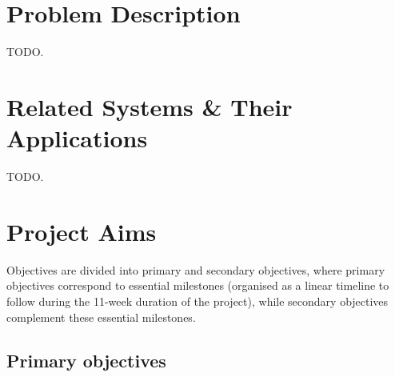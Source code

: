 \section{Problem Description}
\label{sec:problem-description}

TODO.\\


\section{Related Systems \& Their Applications}
\label{sec:v2v_applications}

TODO.\\


\section{Project Aims}
\label{sec:introduction-project-aims}

Objectives are divided into primary and secondary objectives, where primary objectives correspond to essential milestones (organised as a linear timeline to follow during the 11-week duration of the project), while secondary objectives complement these essential milestones.

\subsection{Primary objectives}

